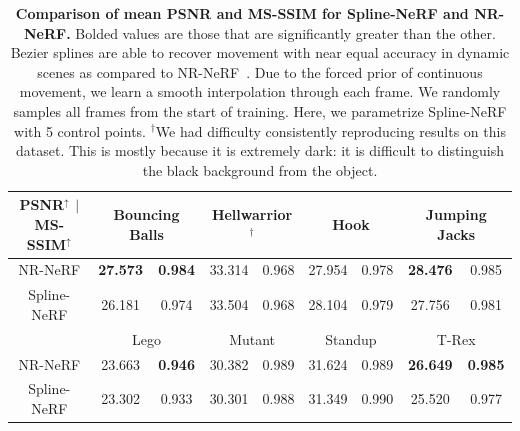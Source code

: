 \begin{table}[t]
    \centering
    \begin{tabular}{|c| c|c | c|c | c|c | c|c |}
    \hline
    \textbf{PSNR$^\uparrow$ $|$ MS-SSIM$^\uparrow$} & \multicolumn{2}{c|}{Bouncing Balls} & \multicolumn{2}{c|}{Hellwarrior$^\dagger$} & \multicolumn{2}{c|}{Hook} & \multicolumn{2}{c|}{Jumping Jacks} \\
    \hline
    NR-NeRF & \textbf{27.573} & \textbf{0.984}
           & 33.314 & 0.968
           & 27.954 & 0.978
           & \textbf{28.476} & 0.985 \\
    \hline
    Spline-NeRF & 26.181 & 0.974
               & 33.504 & 0.968
               & 28.104 & 0.979
               & 27.756 & 0.981 \\
    \hline
    & \multicolumn{2}{c|}{Lego} & \multicolumn{2}{c|}{Mutant} & \multicolumn{2}{c|}{Standup} & \multicolumn{2}{c|}{T-Rex} \\
    \hline
    NR-NeRF & 23.663 & \textbf{0.946}
           & 30.382 & 0.989
           & 31.624 & 0.989
           & \textbf{26.649} & \textbf{0.985} \\
    \hline
    Spline-NeRF & 23.302 & 0.933
               & 30.301 & 0.988
               & 31.349 & 0.990
               & 25.520 & 0.977 \\
    \hline
    \end{tabular}
    \vspace{2pt}
    \caption{
        \label{tab:dnerf_cmp}
        \textbf{Comparison of mean PSNR and MS-SSIM for Spline-NeRF and NR-NeRF.} Bolded values are those that are significantly greater than the other.
        Bezier splines are able to recover movement with near equal accuracy in dynamic scenes as compared to NR-NeRF~\cite{tretschk2021nonrigid}. Due to the forced prior of continuous movement, we learn a smooth interpolation through each frame. We randomly samples all frames from the start of training. Here, we parametrize Spline-NeRF with 5 control points. \newline
        $^\dagger$We had difficulty consistently reproducing results on this dataset. This is mostly because it is extremely dark: it is difficult to distinguish the black background from the object.
    }
    \vspace{-6mm}
\end{table}

